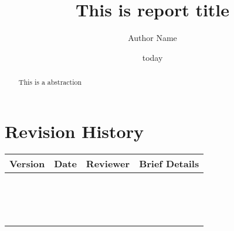 \documentclass[11pt,a4paper]{report}
\begin{document}
\raggedright{} %

\title{This is report title}
\author{Author Name}
\date{today}
\maketitle

\renewcommand*\thesection{\Large{\arabic{section}}}
\section*{Revision History}
	\begin{table}[h!]
		\centering
		\begin{longtable}{|c|c|c|p{7cm}|} \hline
			\textbf{Version} & \textbf{Date} & \textbf{Reviewer} & \textbf{Brief Details} \\\hline
			\endhead
			\endfoot
			\endlastfoot
			& & & \\\hline
			& & & \\\hline
			& & & \\\hline
			& & & \\\hline
			& & & \\\hline
			& & & \\\hline
			& & & \\\hline
			& & & \\\hline
			& & & \\\hline
			& & & \\\hline
			& & & \\\hline
			& & & \\\hline
			& & & \\\hline
			& & & \\\hline
			& & & \\\hline
		\end{longtable}
	\end{table}
\pagebreak

\renewcommand{\abstractname}{Executive Summary}
\begin{abstract}
This is a abstraction

\end{abstract}
\end{document}

